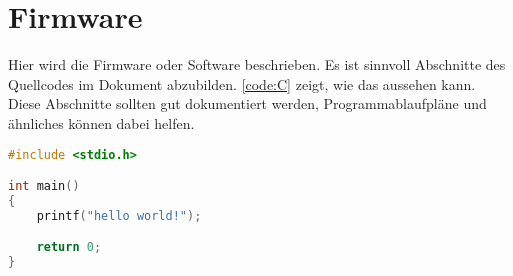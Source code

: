 

\section{Firmware}
	
Hier wird die Firmware oder Software beschrieben. Es ist sinnvoll Abschnitte des Quellcodes im Dokument abzubilden. \autoref{code:C} zeigt, wie das aussehen kann. Diese Abschnitte sollten gut dokumentiert werden, Programmablaufpläne und ähnliches können dabei helfen.


\begin{lstlisting}[language=c, caption={C Beispiel}, label=code:C]
#include <stdio.h>

int main()
{
	printf("hello world!");                    

	return 0;
}
\end{lstlisting}
